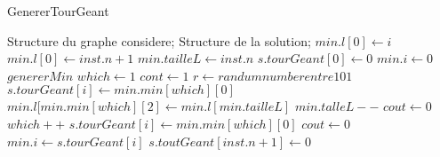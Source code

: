 \documentclass[11pt]{ctexart}
\begin{document}
\renewcommand{\thealgorithm}{} %
    \begin{algorithm}
        \caption{GenererTourGeant} %
        \begin{algorithmic}[1] %
            \Require Structure du graphe considere;
                    Structure de la solution;
                \State $min.l[0] \leftarrow i$
            \EndFor
            \State $min.l[0] \leftarrow inst.n +1$
            \State $min.tailleL \leftarrow inst.n$
            \State $s.tourGeant[0] \leftarrow 0 $
            \State $min.i \leftarrow 0$
                \State $genererMin$
                \State $which \leftarrow 1$
                \State $cont \leftarrow 1$
                    \State $r \leftarrow randum number entre 101$
                        \State $s.tourGeant[i] \leftarrow min.min[which][0]$
                        \State $min.l[min.min[which][2] \leftarrow min.l[min.tailleL]$
                        \State $min.talleL --$
                        \State $cout \leftarrow 0$
                    \Else{}
                        \State $which ++$
                            \State $s.tourGeant[i] \leftarrow min.min[which][0]$
                            \State $cout \leftarrow 0$
                        \EndIf
                    \EndIf
                \EndWhile
                \State $min.i \leftarrow s.tourGeant[i]$
            \EndFor
            \State $s.toutGeant[inst.n+1] \leftarrow 0$
        \end{algorithmic}
    \end{algorithm}
\end{document}
